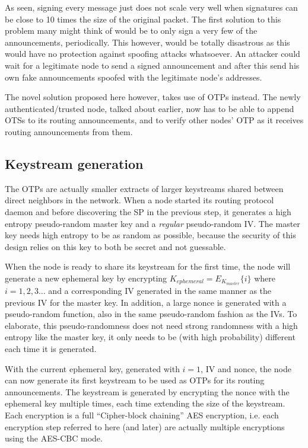 As seen, signing every message just does not scale very well when signatures can
be close to 10 times the size of the original packet. The first solution to this
problem many might think of would be to only sign a very few of the
announcements, periodically. This however, would be totally disastrous as this
would have no protection against spoofing attacks whatsoever. An attacker could
wait for a legitimate node to send a signed announcement and after this send his
own fake announcements spoofed with the legitimate node's addresses.

The novel solution proposed here however, takes use of \acp{OTP} instead. The
newly authenticated/trusted node, talked about earlier, now has to be able to
append \acp{OTS} to its routing announcements, and to verify other nodes'
\ac{OTP} as it receives routing announcements from them.

\subsection{Keystream generation}
The \acp{OTP} are actually smaller extracts of larger keystreams shared
between direct neighbors in the network. When a node started its routing
protocol daemon and before discovering the \ac{SP} in the previous step, it
generates a high entropy pseudo-random master key and a \emph{regular}
pseudo-random \ac{IV}. The master key needs high entropy to be as random as
possible, because the security of this design relies on this key to both be
secret and not guessable.

When the node is ready to share its keystream for the first time, the node will
generate a new ephemeral key by encrypting $K_{ephemeral} =
E_{K_{master}}\{i\}$ where $i = 1,2,3\ldots$ and a corresponding \ac{IV}
generated in the same manner as the previous \ac{IV} for the master key. In
addition, a large nonce is generated with a pseudo-random function, also in the
same pseudo-random fashion as the \acp{IV}. To elaborate, this pseudo-randomness
does not need strong randomness with a high entropy like the master key, it only
needs to be (with high probability) different each time it is generated.

With the current ephemeral key, generated with $i = 1$, \ac{IV} and nonce, the
node can now generate its first keystream to be used as \acp{OTP} for its
routing announcements. The keystream is generated by encrypting the nonce with
the ephemeral key multiple times, each time extending the size of the
keystream. Each encryption is a full ``Cipher-block chaining'' AES encryption,
i.e. each encryption step referred to here (and later) are actually multiple
encryptions using the AES-CBC mode.

